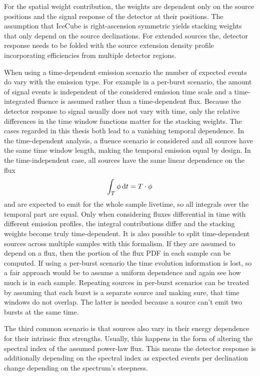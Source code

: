 For the spatial weight contribution, the weights are dependent only on the source positions and the signal response of the detector at their positions.
The assumption that IceCube is right-ascension symmetric yields stacking weights that only depend on the source declinations.
For extended sources the, detector response needs to be folded with the source extension density profile incorporating efficiencies from multiple detector regions.

When using a time-dependent emission scenario the number of expected events do vary with the emission type.
For example in a per-burst scenario, the amount of signal events is independent of the considered emission time scale and a time-integrated fluence is assumed rather than a time-dependent flux.
Because the detector response to signal usually does not vary with time, only the relative differences in the time window functions matter for the stacking weights.
The cases regarded in this thesis both lead to a vanishing temporal dependence.
In the time-dependent analysis, a fluence scenario is considered and all sources have the same time window length, making the temporal emission equal by design.
In the time-independent case, all sources have the same linear dependence on the flux
\begin{equation}
  \int_T \phi \,\mathrm{d}t = T\cdot \phi
\end{equation}
and are expected to emit for the whole sample livetime, so all integrals over the temporal part are equal.
Only when considering fluxes differential in time with different emission profiles, the integral contributions differ and the stacking weights become truly time-dependent.
It is also possible to split time-dependent sources across multiple samples with this formalism.
If they are assumed to depend on a flux, then the portion of the flux PDF in each sample can be computed.
If using a per-burst scenario the time evolution information is lost, so a fair approach would be to assume a uniform dependence and again see how much is in each sample.
Repeating sources in per-burst scenarios can be treated by assuming that each burst is a separate source and making sure, that time windows do not overlap.
The latter is needed because a source can't emit two bursts at the same time.

The third common scenario is that sources also vary in their energy dependence for their intrinsic flux strengths.
Usually, this happens in the form of altering the spectral index of the assumed power-law flux.
This means the detector response is additionally depending on the spectral index as expected events per declination change depending on the spectrum's steepness.

